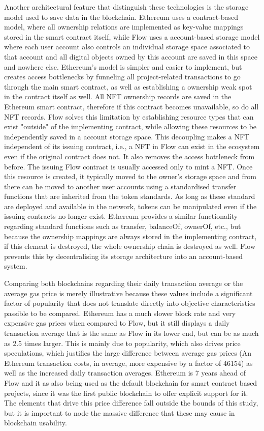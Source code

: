 \documentclass[../main.tex]{subfiles}
\begin{document}
Another architectural feature that distinguish these technologies is the storage model used to save data in the blockchain. Ethereum uses a contract-based model, where all ownership relations are implemented as key-value mappings stored in the smart contract itself, while Flow uses a account-based storage model where each user account also controls an individual storage space associated to that account and all digital objects owned by this account are saved in this space and nowhere else. Ethereum's model is simpler and easier to implement, but creates access bottlenecks by funneling all project-related transactions to go through the main smart contract, as well as establishing a ownership weak spot in the contract itself as well. All NFT ownership records are saved in the Ethereum smart contract, therefore if this contract becomes unavailable, so do all NFT records. Flow solves this limitation by establishing resource types that can exist "outside" of the implementing contract, while allowing these resources to be independently saved in a account storage space. This decoupling makes a NFT independent of its issuing contract, i.e., a NFT in Flow can exist in the ecosystem even if the original contract does not. It also removes the access bottleneck from before. The issuing Flow contract is usually accessed only to mint a NFT. Once this resource is created, it typically moved to the owner's storage space and from there can be moved to another user accounts using a standardised transfer functions that are inherited from the token standards. As long as these standard are deployed and available in the network, tokens can be manipulated even if the issuing contracts no longer exist. Ethereum provides a similar functionality regarding standard functions such as transfer, balanceOf, ownerOf, etc., but because the ownership mappings are always stored in the implementing contract, if this element is destroyed, the whole ownership chain is destroyed as well. Flow prevents this by decentralising its storage architecture into an account-based system.
\par
Comparing both blockchains regarding their daily transaction average or the average gas price is merely illustrative because these values include a significant factor of popularity that does not translate directly into objective characteristics passible to be compared. Ethereum has a much slower block rate and very expensive gas prices when compared to Flow, but it still displays a daily transaction average that is the same as Flow in its lower end, but can be as much as 2.5 times larger. This is mainly due to popularity, which also drives price speculations, which justifies the large difference between average gas prices (An Ethereum transaction costs, in average, more expensive by a factor of 46154) as well as the increased daily transaction averages. Ethereum is 7 years ahead of Flow and it as also being used as the default blockchain for smart contract based projects, since it was the first public blockchain to offer explicit support for it. The elements that drive this price difference fall outside the bounds of this study, but it is important to node the massive difference that these may cause in blockchain usability.
\end{document}
